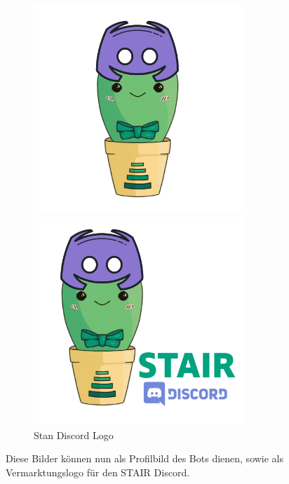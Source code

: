 \documentclass[a4paper, table]{article}
\begin{document}
\begin{figure}[h]
    \begin{minipage}[t]{0.5\textwidth}
        \includegraphics[width=0.7\textwidth]{img/StanDiscordLogoSolo.png}
    \end{minipage}
    \begin{minipage}[t]{0.5\textwidth}
        \includegraphics[width=0.7\textwidth]{img/StanDiscordLogo.png}
    \end{minipage}
    \caption{Stan Discord Logo}
    \label{fig:stan-discord-logo}
\end{figure}

Diese Bilder können nun als Profilbild des Bots dienen, sowie als Vermarktungslogo für den STAIR Discord.
\end{document}

